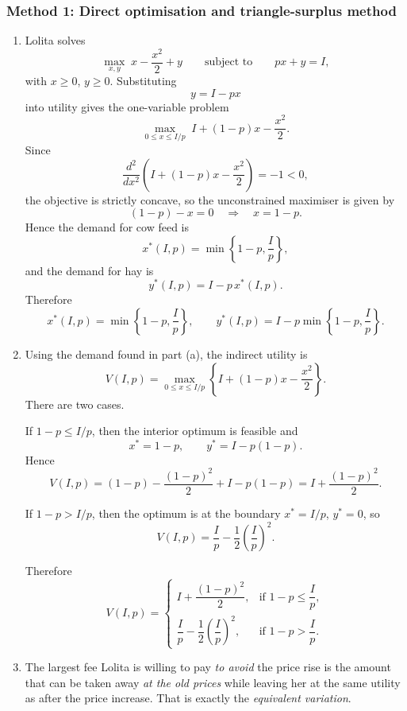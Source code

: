 \documentclass[12pt]{article}
\begin{document}
\subsubsection{Method 1: Direct optimisation and triangle-surplus method}
\begin{enumerate}[label=(\alph*)]
    \item
    Lolita solves
    \[
    \max_{x,y}\; x-\frac{x^2}{2}+y
    \qquad\text{subject to}\qquad
    px+y=I,
    \]
    with \(x\ge 0\), \(y\ge 0\). Substituting
    \[
    y=I-px
    \]
    into utility gives the one-variable problem
    \[
    \max_{0\le x\le I/p}\;
    I+(1-p)x-\frac{x^2}{2}.
    \]
    Since
    \[
    \frac{d^2}{dx^2}\!\left(I+(1-p)x-\frac{x^2}{2}\right)=-1<0,
    \]
    the objective is strictly concave, so the unconstrained maximiser is given by
    \[
    (1-p)-x=0
    \quad\Longrightarrow\quad
    x=1-p.
    \]
    Hence the demand for cow feed is
    \[
    x^*(I,p)=\min\left\{1-p,\frac{I}{p}\right\},
    \]
    and the demand for hay is
    \[
    y^*(I,p)=I-p\,x^*(I,p).
    \]
    Therefore
    \[
    \boxed{\;
    x^*(I,p)=\min\left\{1-p,\frac{I}{p}\right\},
    \qquad
    y^*(I,p)=I-p\min\left\{1-p,\frac{I}{p}\right\}.
    \;}
    \]

    \item
    Using the demand found in part (a), the indirect utility is
    \[
    V(I,p)=\max_{0\le x\le I/p}\left\{I+(1-p)x-\frac{x^2}{2}\right\}.
    \]
    There are two cases.

    If \(1-p\le I/p\), then the interior optimum is feasible and
    \[
    x^*=1-p,
    \qquad
    y^*=I-p(1-p).
    \]
    Hence
    \[
    V(I,p)
    =
    (1-p)-\frac{(1-p)^2}{2}+I-p(1-p)
    =
    I+\frac{(1-p)^2}{2}.
    \]

    If \(1-p>I/p\), then the optimum is at the boundary \(x^*=I/p\), \(y^*=0\), so
    \[
    V(I,p)
    =
    \frac{I}{p}-\frac{1}{2}\left(\frac{I}{p}\right)^2.
    \]

    Therefore
    \[
    \boxed{
    V(I,p)=
    \begin{cases}
    I+\dfrac{(1-p)^2}{2}, & \text{if } 1-p\le \dfrac{I}{p},\\[1.2ex]
    \dfrac{I}{p}-\dfrac{1}{2}\left(\dfrac{I}{p}\right)^2, & \text{if } 1-p>\dfrac{I}{p}.
    \end{cases}}
    \]

    \item
    The largest fee Lolita is willing to pay \emph{to avoid} the price rise is the amount that can be taken away \emph{at the old prices} while leaving her at the same utility as after the price increase. That is exactly the \emph{equivalent variation}.


\end{enumerate}
\end{document}

